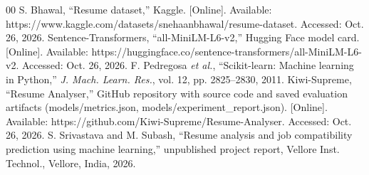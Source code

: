\documentclass[conference]{IEEEtran}
\begin{document}
\begin{thebibliography}{00}
 S. Bhawal, ``Resume dataset,'' Kaggle. [Online]. Available: https://www.kaggle.com/datasets/snehaanbhawal/resume-dataset. Accessed: Oct. 26, 2026.
 Sentence-Transformers, ``all-MiniLM-L6-v2,'' Hugging Face model card. [Online]. Available: https://huggingface.co/sentence-transformers/all-MiniLM-L6-v2. Accessed: Oct. 26, 2026.
 F. Pedregosa \textit{et al.}, ``Scikit-learn: Machine learning in Python,'' \textit{J. Mach. Learn. Res.}, vol. 12, pp. 2825--2830, 2011.
 Kiwi-Supreme, ``Resume Analyser,'' GitHub repository with source code and saved evaluation artifacts (models/metrics.json, models/experiment\_report.json). [Online]. Available: https://github.com/Kiwi-Supreme/Resume-Analyser. Accessed: Oct. 26, 2026.
 S. Srivastava and M. Subash, ``Resume analysis and job compatibility prediction using machine learning,'' unpublished project report, Vellore Inst. Technol., Vellore, India, 2026.
\end{thebibliography}
\end{document}
